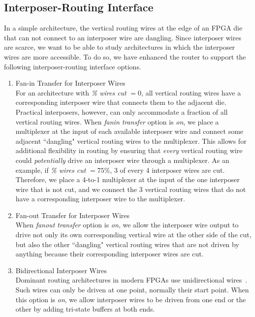\documentclass[journal]{IEEEtran}
\begin{document}
\subsection{Interposer-Routing Interface}
\label{sec:interposer-routing-interface}
In a simple architecture, the vertical routing wires at the edge of an FPGA die that can not connect to an interposer wire are dangling. Since interposer wires are scarce, we want to be able to study architectures in which the interposer wires are more accessible. To do so, we have enhanced the router to support the following interposer-routing interface options.

\begin{enumerate}
\item Fan-in Transfer for Interposer Wires\\
For an architecture with \textit{\% wires cut} $=0$, all vertical routing wires have a corresponding interposer wire that connects them to the adjacent die. Practical interposers, however, can only accommodate a fraction of all vertical routing wires. When \textit{fanin transfer} option is \textit{on}, we place a multiplexer at the input of each available interposer wire and connect some adjacent ``dangling" vertical routing wires to the multiplexer. This allows for additional flexibility in routing by ensuring that \textit{every} vertical routing wire could \textit{potentially} drive an interposer wire through a multiplexer. As an example, if \textit{\% wires cut} $=75\%$, 3 of every 4 interposer wires are cut. Therefore, we place a 4-to-1 multiplexer at the input of the one interposer wire that is not cut, and we connect the 3 vertical routing wires that do not have a corresponding interposer wire to the multiplexer. 

\item Fan-out Transfer for Interposer Wires\\
When \textit{fanout transfer} option is \textit{on}, we allow the interposer wire output to drive not only its own corresponding vertical wire at the other side of the cut, but also the other ``dangling" vertical routing wires that are not driven by anything because their corresponding interposer wires are cut.

\item Bidirectional Interposer Wires\\
Dominant routing architectures in modern FPGAs use unidirectional wires~\cite{unidirectional, lewis2005stratix}. Such wires can only be driven at one point, normally their start point. When this option is \textit{on}, we allow interposer wires to be driven from one end or the other by adding tri-state buffers at both ends.
\end{enumerate}
\end{document}
